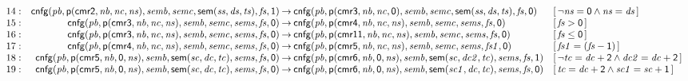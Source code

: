 \documentclass[a4paper]{article}
\newcommand{\symb}[1]{\mathsf{#1}}
\newcommand{\var}[1]{\mathit{#1}}
\newcommand{\Constraint}[1]{[\, #1 \,]}
\begin{document}
\begin{landscape}
\[\begin{array}{rr@{\>}c@{\>}ll}
\mathrm{14} : 
 & \symb{cnfg}(\var{pb},\symb{p}(\symb{cmr2},\var{nb},\var{nc},\var{ns}),\var{semb},\var{semc},\symb{sem}(\var{ss},\var{ds},\var{ts}),\var{fs},\symb{1})
 & \to 
 & \symb{cnfg}(\var{pb},\symb{p}(\symb{cmr3},\var{nb},\var{nc},\symb{0}),\var{semb},\var{semc},\symb{sem}(\var{ss},\var{ds},\var{ts}),\var{fs},\symb{0})
 & \Constraint{\neg \var{ns} = \symb{0} \land \var{ns} = \var{ds}}\\

\mathrm{15} : 
 & \symb{cnfg}(\var{pb},\symb{p}(\symb{cmr3},\var{nb},\var{nc},\var{ns}),\var{semb},\var{semc},\var{sems},\var{fs},\symb{0})
 & \to 
 & \symb{cnfg}(\var{pb},\symb{p}(\symb{cmr4},\var{nb},\var{nc},\var{ns}),\var{semb},\var{semc},\var{sems},\var{fs},\symb{0})
 & \Constraint{\var{fs} > \symb{0}}\\

\mathrm{16} : 
 & \symb{cnfg}(\var{pb},\symb{p}(\symb{cmr3},\var{nb},\var{nc},\var{ns}),\var{semb},\var{semc},\var{sems},\var{fs},\symb{0})
 & \to 
 & \symb{cnfg}(\var{pb},\symb{p}(\symb{cmr11},\var{nb},\var{nc},\var{ns}),\var{semb},\var{semc},\var{sems},\var{fs},\symb{0})
 & \Constraint{\var{fs} \leq \symb{0}}\\

\mathrm{17} : 
 & \symb{cnfg}(\var{pb},\symb{p}(\symb{cmr4},\var{nb},\var{nc},\var{ns}),\var{semb},\var{semc},\var{sems},\var{fs},\symb{0})
 & \to 
 & \symb{cnfg}(\var{pb},\symb{p}(\symb{cmr5},\var{nb},\var{nc},\var{ns}),\var{semb},\var{semc},\var{sems},\var{fs1},\symb{0})
 & \Constraint{\var{fs1} = (\var{fs} - \symb{1})}\\

\mathrm{18} : 
 & \symb{cnfg}(\var{pb},\symb{p}(\symb{cmr5},\var{nb},\symb{0},\var{ns}),\var{semb},\symb{sem}(\var{sc},\var{dc},\var{tc}),\var{sems},\var{fs},\symb{0})
 & \to 
 & \symb{cnfg}(\var{pb},\symb{p}(\symb{cmr6},\var{nb},\symb{0},\var{ns}),\var{semb},\symb{sem}(\var{sc},\var{dc2},\var{tc}),\var{sems},\var{fs},\symb{1})
 & \Constraint{\neg \var{tc} = \var{dc} + \symb{2} \land \var{dc2} = \var{dc} + \symb{2}}\\

\mathrm{19} : 
 & \symb{cnfg}(\var{pb},\symb{p}(\symb{cmr5},\var{nb},\symb{0},\var{ns}),\var{semb},\symb{sem}(\var{sc},\var{dc},\var{tc}),\var{sems},\var{fs},\symb{0})
 & \to 
 & \symb{cnfg}(\var{pb},\symb{p}(\symb{cmr6},\var{nb},\symb{0},\var{ns}),\var{semb},\symb{sem}(\var{sc1},\var{dc},\var{tc}),\var{sems},\var{fs},\symb{0})
 & \Constraint{\var{tc} = \var{dc} + \symb{2} \land \var{sc1} = \var{sc} + \symb{1}}\\


\end{array}\]
\end{landscape}
\end{document}
